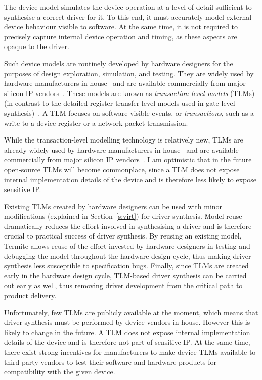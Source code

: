 The device model simulates the device operation at a level of detail sufficient to synthesise a correct driver for it.  To this end, it must accurately model external device behaviour visible to software.  At the same time, it is not required to precisely capture internal device operation and timing, as these aspects are opaque to the driver.

Such device models are routinely developed by hardware designers for the purposes of design exploration, simulation, and testing. They are widely used by hardware manufacturers in-house~\cite{cofluent} and are available commercially from major silicon IP vendors~\cite{vp}.  These models are known as \emph{transaction-level models} (TLMs) (in contrast to the detailed register-transfer-level models used in gate-level synthesis)~\cite{Cai_Gajski_03}.  A TLM focuses on software-visible events, or \emph{transactions}, such as a write to a device register or a network packet transmission.

While the transaction-level modelling technology is relatively new, TLMs are already widely used by hardware manufacturers in-house~\cite{cofluent} and are available commercially from major silicon IP vendors~\cite{vp}.  I am optimistic that in the future open-source TLMs will become commonplace, since a TLM does not expose internal implementation details of the device and is therefore less likely to expose sensitive IP.

Existing TLMs created by hardware designers can be used with minor modifications (explained in Section~\ref{s:virt}) for driver synthesis.  Model reuse dramatically reduces the effort involved in synthesising a driver and is therefore crucial to practical success of driver synthesis.  By reusing an existing model, Termite allows reuse of the effort invested by hardware designers in testing and debugging the model throughout the hardware design cycle, thus making driver synthesis less susceptible to specification bugs.  Finally, since TLMs are created early in the hardware design cycle, TLM-based driver synthesis can be carried out early as well, thus removing driver development from the critical path to product delivery.

Unfortunately, few TLMs are publicly available at the moment, which means that driver synthesis must be performed by  device vendors in-house.  However this is likely to change in the future.  A TLM does not expose internal implementation details of the device and is therefore not part of sensitive IP\@.  At the same time, there exist strong incentives for manufacturers to make device TLMs available to third-party vendors to test their software and hardware products for compatibility with the given device.

